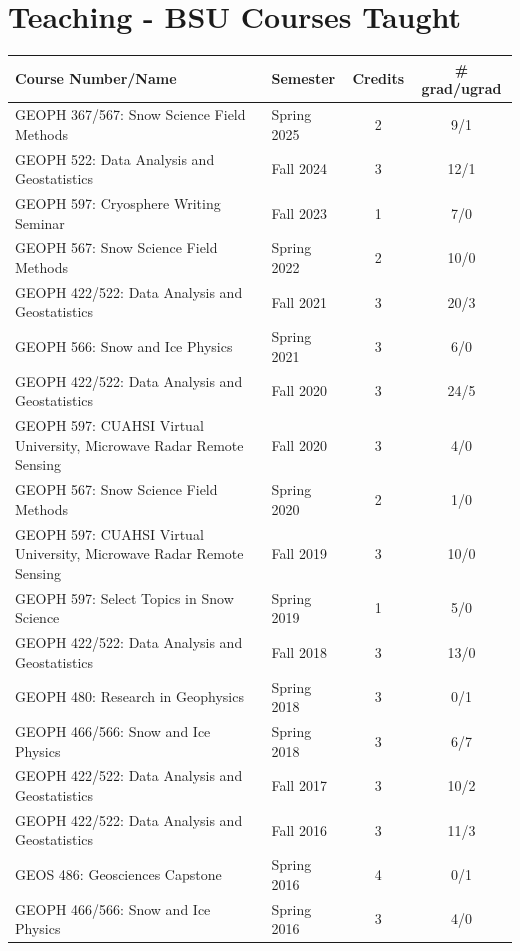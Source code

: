 \documentclass[11pt]{article}
\renewcommand\arraystretch{1}
\begin{document}
\begin{table}[!htbp]
\section*{Teaching - BSU Courses Taught}
\renewcommand\arraystretch{0.7}
  \centering
  \begin{tabular}{|l|l|c|c|}
\hline
\textbf{Course Number/Name} & \textbf{Semester} & \textbf{Credits} & \textbf{\# grad/ugrad} \\ \hline \hline
GEOPH 367/567: Snow Science Field Methods & Spring 2025 & 2 &  9/1 \\ \hline
GEOPH 522: Data Analysis and Geostatistics & Fall 2024 & 3 & 12/1 \\ \hline
GEOPH 597: Cryosphere Writing Seminar & Fall 2023 & 1 & 7/0 \\ \hline
GEOPH 567: Snow Science Field Methods & Spring 2022 & 2 & 10/0 \\ \hline
GEOPH 422/522: Data Analysis and Geostatistics & Fall 2021 & 3 & 20/3 \\ \hline
GEOPH 566: Snow and Ice Physics & Spring 2021 & 3 & 6/0 \\ \hline
GEOPH 422/522: Data Analysis and Geostatistics & Fall 2020 & 3 & 24/5 \\ \hline
GEOPH 597: CUAHSI Virtual University, Microwave Radar Remote Sensing & Fall 2020 & 3 & 4/0 \\ \hline
GEOPH 567: Snow Science Field Methods & Spring 2020 & 2 & 1/0 \\ \hline
GEOPH 597: CUAHSI Virtual University,  Microwave Radar Remote Sensing & Fall 2019 & 3 & 10/0 \\ \hline
GEOPH 597: Select Topics in Snow Science & Spring 2019 & 1 & 5/0 \\ \hline
GEOPH 422/522: Data Analysis and Geostatistics & Fall 2018 & 3 & 13/0 \\ \hline
GEOPH 480: Research in Geophysics & Spring 2018 & 3 & 0/1 \\ \hline
GEOPH 466/566: Snow and Ice Physics & Spring 2018 & 3 & 6/7 \\ \hline
GEOPH 422/522: Data Analysis and Geostatistics & Fall 2017 & 3 & 10/2 \\ \hline
GEOPH 422/522: Data Analysis and Geostatistics & Fall 2016 & 3 & 11/3 \\ \hline
GEOS 486: Geosciences Capstone & Spring 2016 & 4 & 0/1 \\ \hline
GEOPH 466/566: Snow and Ice Physics & Spring 2016 & 3 & 4/0 \\ \hline

\end{tabular}
\end{table}
\end{document}

